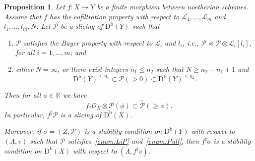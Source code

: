 \documentclass[11pt, reqno]{amsart}
\numberwithin{equation}{section}
\theoremstyle{plain}
\newtheorem{proposition}[theorem]{Proposition}
\theoremstyle{remark}
\theoremstyle{definition}
\theoremstyle{italicsname}
\newcommand{\Db}{\mathrm{D^b}}
\newcommand{\cO}{\mathcal{O}}
\newcommand{\cL}{\mathcal{L}}
\newcommand{\cP}{\mathscr{P}}
\def\RR{\ensuremath{\mathbb{R}}}
\begin{document}
\begin{proposition}\label{prop:PullbackStability}
Let $f\colon X\to Y$ be a finite morphism between noetherian schemes.
Assume that $f$ has the cofiltration property with respect to $\cL_1,\dots,\cL_m$ and $l_1,\dots,l_m,N$.
Let $\cP$ be a slicing of $\Db(Y)$ such that 
\begin{enumerate}[{\rm (i)}]
\item\label{enum:LiP} $\cP$ satisfies the Bayer property with respect to $\cL_i$ and $l_i$, i.e., $\cP\preceq\cP\otimes\cL_i[l_i]$, for all $i=1,\dots,m$; and 
\item\label{enum:Pull} either $N = \infty$, or there exist integers $n_1 \leq n_2$ such that $N\geq n_2-n_1+1$ and 
\[
\Db(Y)^{\leqslant n_1} \subset\cP(>0)\subset
\Db(Y)^{\leqslant n_2}.
\]
\end{enumerate}
Then for all $\phi\in\RR$ we have 
\[
f_*\cO_X\otimes\cP(\phi) \subset \widehat{\cP}(\geq\phi).
\]
In particular, $f^\sharp\cP$ is a slicing of $\Db(X)$.

Moreover, if $\sigma=(Z,\cP)$ is a stability condition on $\Db(Y)$ with respect to $(\Lambda,v)$ such that $\cP$ satisfies~\ref{enum:LiP} and~\ref{enum:Pull}, then $f^\sharp\sigma$ is a stability condition on $\Db(X)$ with respect to $(\Lambda,f^\sharp v)$.
\end{proposition}
\end{document}
